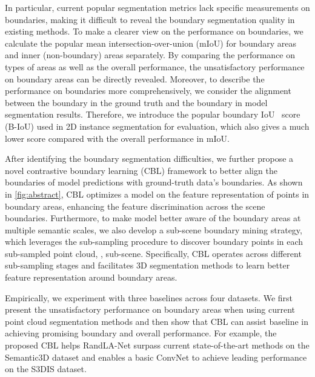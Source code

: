 \documentclass[10pt,twocolumn,letterpaper]{article}
\begin{document}
In particular, current popular segmentation metrics lack specific measurements on boundaries, making it difficult to reveal the boundary segmentation quality in existing methods. To make a clearer view on the performance on boundaries, we calculate the popular mean intersection-over-union (mIoU) for boundary areas and inner (non-boundary) areas separately. By comparing the performance on types of areas as well as the overall performance, the unsatisfactory performance on boundary areas can be directly revealed.
Moreover, to describe the performance on boundaries more comprehensively, we consider the alignment between the boundary in the ground truth and the boundary in model segmentation results. Therefore, we introduce the popular boundary IoU~\cite{bound_iou} score (B-IoU) used in 2D instance segmentation for evaluation, which also gives a much lower score compared with the overall performance in mIoU.

After identifying the boundary segmentation difficulties,
we further propose a novel contrastive boundary learning (CBL) framework to better align the boundaries of model predictions with ground-truth data's boundaries.
As shown in \cref{fig:abstract}, CBL optimizes a model on the feature representation of points in boundary areas, enhancing the feature discrimination across the scene boundaries. 
Furthermore, to make model better aware of the boundary areas at multiple semantic scales, we also develop a sub-scene boundary mining strategy, which leverages the sub-sampling procedure to discover boundary points in each sub-sampled point cloud, \ie, sub-scene.
Specifically, CBL operates across different sub-sampling stages and
facilitates 3D segmentation methods to learn better feature representation around boundary areas.

Empirically, we experiment with three baselines across four datasets. We first present the unsatisfactory performance on boundary areas when using current point cloud segmentation methods and then show that CBL can assist baseline in achieving promising boundary and overall performance. For example, the proposed CBL helps RandLA-Net surpass current state-of-the-art methods on the Semantic3D dataset and enables a basic ConvNet to achieve leading performance on the S3DIS dataset.
\end{document}
